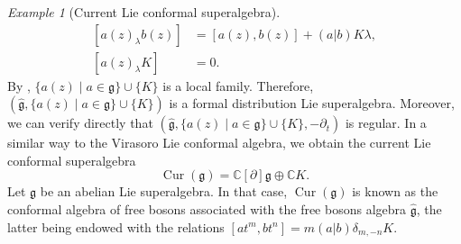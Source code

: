 \documentclass[a4paper, 12pt, reqno]{amsart}
\theoremstyle{remark}
\newtheorem{example}[theorem]{Example}
\numberwithin{equation}{subsection}
\DeclareMathOperator{\Cur}{Cur}
\begin{document}
\begin{example}[Current Lie conformal superalgebra]
  \begin{equation*}
    \begin{aligned}
    [a(z)_{\lambda}b(z)] &= [a(z), b(z)] + (a| b)K\lambda, \\
    [a(z)_{\lambda}K] &= 0.
    \end{aligned}
  \end{equation*}
  By , $\{a(z) \mid a \in \mathfrak{g}\} \cup \{K\}$ is a local family.
  Therefore, $(\hat{\mathfrak{g}}, \{a(z) \mid a \in \mathfrak{g}\} \cup \{K\})$ is a formal distribution Lie superalgebra.
  Moreover, we can verify directly that $(\hat{\mathfrak{g}}, \{a(z) \mid a \in \mathfrak{g}\} \cup \{K\}, -\partial_t)$ is regular.
  In a similar way to the Virasoro Lie conformal algebra, we obtain the current Lie conformal superalgebra
  \begin{equation*}
    \Cur(\mathfrak{g}) = \mathbb{C}[\partial]\mathfrak{g} \oplus \mathbb{C}K.
  \end{equation*}
  Let $\mathfrak{g}$ be an abelian Lie superalgebra.
  In that case, $\Cur(\mathfrak{g})$ is known as the conformal algebra of free bosons associated with the free bosons algebra $\hat{\mathfrak{g}}$, the latter being endowed with the relations $[at^m, bt^n] = m(a| b)\delta_{m, -n}K$. 
\end{example}
\end{document}
